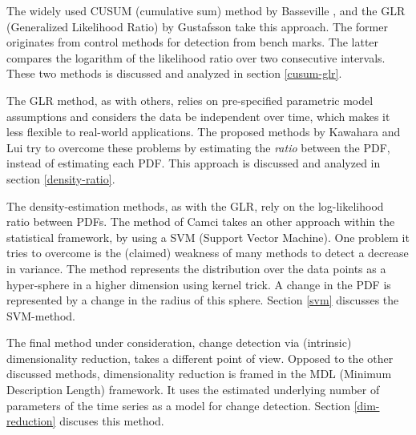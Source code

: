 The widely used CUSUM (cumulative sum) method by Basseville \etal \cite{basseville1993detection}, and the GLR (Generalized Likelihood Ratio) by Gustafsson \cite{gustafsson1996marginalized,gustafsson2000adaptive} take this approach.
The former originates from control methods for detection from bench marks.
The latter compares the logarithm of the likelihood ratio over two consecutive intervals.
These two methods is discussed and analyzed in section \ref{cusum-glr}.

The GLR method, as with others, relies on pre-specified parametric model assumptions and considers the data be independent over time, which makes it less flexible to real-world applications.
The proposed methods by Kawahara \etal \cite{kawahara2009change} and Lui \etal \cite{liu2013change} try to overcome these problems by estimating the \emph{ratio} between the PDF, instead of estimating each PDF.
This approach is discussed and analyzed in section \ref{density-ratio}.

The density-estimation methods, as with the GLR, rely on the log-likelihood ratio between PDFs.
The method of Camci \cite{camci2010change} takes an other approach within the statistical framework, by using a SVM (Support Vector Machine).
One problem it tries to overcome is the (claimed) weakness of many methods to detect a decrease in variance.
The method represents the distribution over the data points as a hyper-sphere in a higher dimension using kernel trick.
A change in the PDF is represented by a change in the radius of this sphere.
Section \ref{svm} discusses the SVM-method.

The final method under consideration, change detection via (intrinsic) dimensionality reduction, takes a different point of view.
Opposed to the other discussed methods, dimensionality reduction is framed in the MDL (Minimum Description Length) framework.
It uses the estimated underlying number of parameters of the time series as a model for change detection.
Section \ref{dim-reduction} discuses this method.










